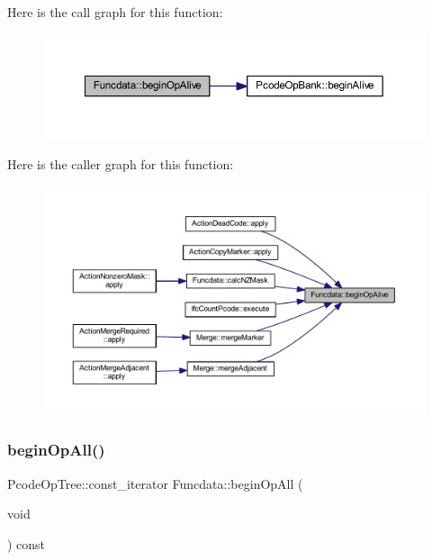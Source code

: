 Here is the call graph for this function\+:
\nopagebreak
\begin{figure}[H]
\begin{center}
\leavevmode
\includegraphics[width=350pt]{class_funcdata_ae1a4f058ff4886d7ae4ceb8160c6f3e0_cgraph}
\end{center}
\end{figure}
Here is the caller graph for this function\+:
\nopagebreak
\begin{figure}[H]
\begin{center}
\leavevmode
\includegraphics[width=350pt]{class_funcdata_ae1a4f058ff4886d7ae4ceb8160c6f3e0_icgraph}
\end{center}
\end{figure}
\mbox{\label{class_funcdata_a1bbd4329856ff0c1ae80672dfbc79d83}} 
\subsubsection{\texorpdfstring{beginOpAll()}{beginOpAll()}}
{\footnotesize\ttfamily Pcode\+Op\+Tree\+::const\+\_\+iterator Funcdata\+::begin\+Op\+All (\begin{DoxyParamCaption}\item[{void}]{ }\end{DoxyParamCaption}) const\hspace{0.3cm}{\ttfamily [inline]}}



